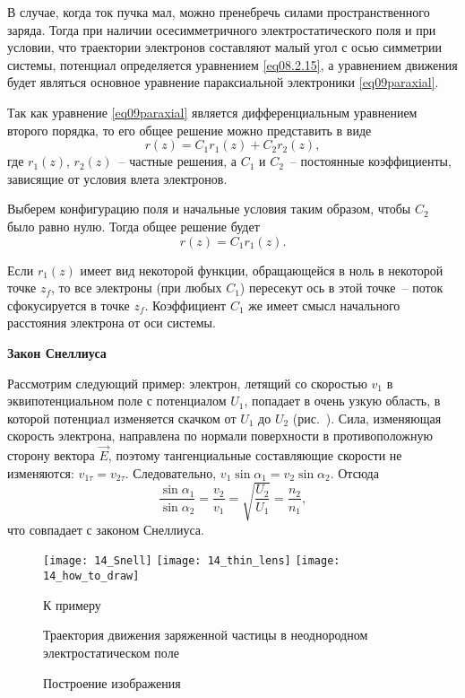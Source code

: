 
В случае, когда ток пучка мал, можно пренебречь силами пространственного заряда.
Тогда при наличии осесимметричного электростатического поля и при условии, что
траектории электронов составляют малый угол с осью симметрии системы, потенциал
определяется уравнением \eqref{eq08.2.15}, а уравнением движения будет являться
основное уравнение параксиальной электроники \eqref{eq09paraxial}.

Так как уравнение \eqref{eq09paraxial} является дифференциальным уравнением
второго порядка, то его общее решение можно представить в виде
\[
  r(z) = C_1 r_1(z) + C_2 r_2(z),
\]
где \( r_1(z) \), \( r_2(z) \)~-- частные решения, а \( C_1 \) и \( C_2 \)~--
постоянные коэффициенты, зависящие от условия влета электронов.

Выберем конфигурацию поля и начальные условия таким образом, чтобы \( C_2 \)
было равно нулю. Тогда общее решение будет
\[
  r(z) = C_1 r_1(z).
\]

Если \( r_1(z) \) имеет вид некоторой функции, обращающейся в ноль в некоторой
точке \( z_f \), то все электроны (при любых \( C_1 \)) пересекут ось в этой
точке~-- поток сфокусируется в точке \( z_f \). Коэффициент \( C_1 \) же имеет
смысл начального расстояния электрона от оси системы.

\bigskip
\textbf{Закон Снеллиуса}

Рассмотрим следующий пример: электрон, летящий со скоростью \( v_1 \) в
эквипотенциальном поле с потенциалом \( U_1 \), попадает в очень узкую область,
в которой потенциал изменяется скачком от \( U_1 \) до \( U_2 \)
(рис.~). Сила, изменяющая скорость электрона, направлена по нормали
поверхности в противоположную сторону вектора \( \vec{E} \), поэтому
тангенциальные составляющие скорости не изменяются: \( v_{1\tau} = v_{2\tau} \).
Следовательно, \( v_1 \sin\alpha_1 = v_2 \sin\alpha_2 \). Отсюда
\[
  \frac{\sin\alpha_1}{\sin\alpha_2} = \frac{v_2}{v_1} = \sqrt{\frac{U_2}{U_1}} =
    \frac{n_2}{n_1},
\]
что совпадает с законом Снеллиуса.
\begin{figure}[h!]
  \center
  \texttt{[image: 14\_Snell]} \hspace{1em}
  \texttt{[image: 14\_thin\_lens]} \hspace{1em}
  \texttt{[image: 14\_how\_to\_draw]} \\
  \parbox{.3\textwidth}{\caption{К примеру} \label{pic14Snell}} \hspace{1em}
  \parbox{.3\textwidth}{\caption{Траектория движения заряженной частицы в
    неоднородном электростатическом поле} \label{pic14thin}} \hspace{1em}
  \parbox{.3\textwidth}{\caption{Построение изображения} \label{pic14draw}}
\end{figure}

